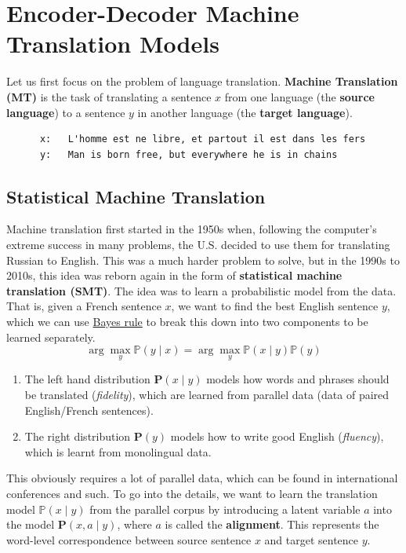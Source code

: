 \documentclass{article}
\begin{document}
\section{Encoder-Decoder Machine Translation Models}

    Let us first focus on the problem of language translation. \textbf{Machine Translation (MT)} is the task of translating a sentence $x$ from one language (the \textbf{source language}) to a sentence $y$ in another language (the \textbf{target language}). 
    \begin{lstlisting}
      x:   L'homme est ne libre, et partout il est dans les fers 
      y:   Man is born free, but everywhere he is in chains 
    \end{lstlisting}

  \subsection{Statistical Machine Translation}

    Machine translation first started in the 1950s when, following the computer's extreme success in many problems, the U.S. decided to use them for translating Russian to English. This was a much harder problem to solve, but in the 1990s to 2010s, this idea was reborn again in the form of \textbf{statistical machine translation (SMT)}. The idea was to learn a probabilistic model from the data. That is, given a French sentence $x$, we want to find the best English sentence $y$, which we can use \hyperref[prob-thm:bayes-rule]{Bayes rule} to break this down into two components to be learned separately.  
    \begin{equation}
      \arg \max_{y} \mathbb{P}(y \mid x) = \arg \max_y \mathbb{P}(x \mid y) \mathbb{P}(y)
    \end{equation}
    \begin{enumerate}
        \item The left hand distribution $\mathbf{P}(x \mid y)$ models how words and phrases should be translated (\textit{fidelity}), which are learned from parallel data (data of paired English/French sentences). 
        \item The right distribution $\mathbf{P}(y)$ models how to write good English (\textit{fluency}), which is learnt from monolingual data. 
    \end{enumerate}
    This obviously requires a lot of parallel data, which can be found in international conferences and such. To go into the details, we want to learn the translation model $\mathbb{P}(x \mid y)$ from the parallel corpus by introducing a latent variable $a$ into the model $\mathbf{P}(x, a \mid y)$, where $a$ is called the \textbf{alignment}. This represents the word-level correspondence between source sentence $x$ and target sentence $y$. 
\end{document}

